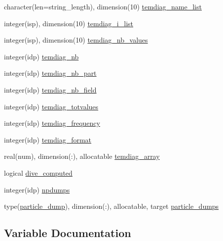 \begin{DoxyCompactItemize}
\item 
character(len=string\+\_\+length), dimension(10) \hyperlink{namespaceoutput__data_a891f4f8be197dbbfe91c01ee5260b4c2}{temdiag\+\_\+name\+\_\+list}
\item 
integer(isp), dimension(10) \hyperlink{namespaceoutput__data_a272ff12d370f1ddd453ed84e0aea955b}{temdiag\+\_\+i\+\_\+list}
\item 
integer(isp), dimension(10) \hyperlink{namespaceoutput__data_a2c62698838d0295802c6b2a6637c3827}{temdiag\+\_\+nb\+\_\+values}
\item 
integer(idp) \hyperlink{namespaceoutput__data_a996655a7d030216dcce6367a59b22ae8}{temdiag\+\_\+nb}
\item 
integer(idp) \hyperlink{namespaceoutput__data_a950d70a052698f77988f39da1fddf632}{temdiag\+\_\+nb\+\_\+part}
\item 
integer(idp) \hyperlink{namespaceoutput__data_a6e3150da1e4314b418b4f40c56737551}{temdiag\+\_\+nb\+\_\+field}
\item 
integer(idp) \hyperlink{namespaceoutput__data_a85fe1c4047057dc4292320e82cae2cda}{temdiag\+\_\+totvalues}
\item 
integer(idp) \hyperlink{namespaceoutput__data_ab55f479db67f7b4af32d0a55e2ba6620}{temdiag\+\_\+frequency}
\item 
integer(idp) \hyperlink{namespaceoutput__data_a2f4ce5fdd4011f5db5c6b9de97cf133a}{temdiag\+\_\+format}
\item 
real(num), dimension(\+:), allocatable \hyperlink{namespaceoutput__data_a034b19d2c3a5211b1fd96df24cd28dd1}{temdiag\+\_\+array}
\item 
logical \hyperlink{namespaceoutput__data_abc6cc1ed098892996b0f0dd858e410d1}{dive\+\_\+computed}
\item 
integer(idp) \hyperlink{namespaceoutput__data_a4dbfde333a6a2225527c27d33472032e}{npdumps}
\item 
type(\hyperlink{structoutput__data_1_1particle__dump}{particle\+\_\+dump}), dimension(\+:), allocatable, target \hyperlink{namespaceoutput__data_a5fbbbcc739158cb15a4a02aa8bc63399}{particle\+\_\+dumps}
\end{DoxyCompactItemize}


\subsection{Variable Documentation}
